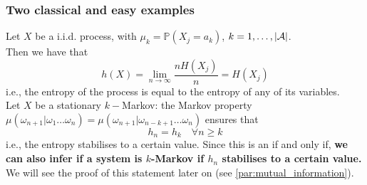 \subsubsection{Two classical and easy examples}
Let $X$ be a i.i.d. process, with $\mu_k = \mathbb{P}(X_j = a_k)$, $k = 1, \dots, |\mathcal{A}|$. 
\\Then we have that 
\begin{equation}
    h(X) = \lim_{n \rightarrow \infty} \frac{n H(X_j)}{n} = H(X_j)
\end{equation}
i.e., the entropy of the process is equal to the entropy of any of its variables.
\\Let $X$ be a stationary $k-$Markov: the Markov property $\mu(\omega_{n+1}| \omega_1 \dots \omega_n) = \mu(\omega_{n+1}| \omega_{n-k+1} \dots \omega_n)$ ensures that 
\begin{equation}
\label{eq:markov_entropy}
    h_n = h_k \quad \forall n \geq k
\end{equation}
i.e., the entropy stabilises to a certain value. Since this is an if and only if, \textbf{we can also infer if a system is $k$-Markov if $h_n$ stabilises to a certain value. } We will see the proof of this statement later on (see \cref{par:mutual_information}).

